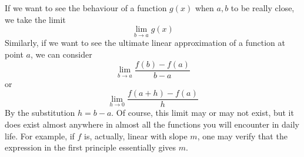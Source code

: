 If we want to see the behaviour of a function $g(x)$ when $a,b$ to be really close, we take the limit
$$\lim_{b\to a}g(x)$$
Similarly, if we want to see the ultimate linear approximation of a function at point $a$, we can consider 
$$\lim_{b\to a}\frac{f(b)-f(a)}{b-a}$$
or
$$\lim_{h\to 0}\frac{f(a+h)-f(a)}{h}$$
By the substitution $h=b-a$. Of course, this limit may or may not exist, but it does exist almost anywhere in almost all the functions you will encounter in daily life.
For example, if $f$ is, actually, linear with slope $m$, one may verify that the expression in the first principle essentially gives $m$.
